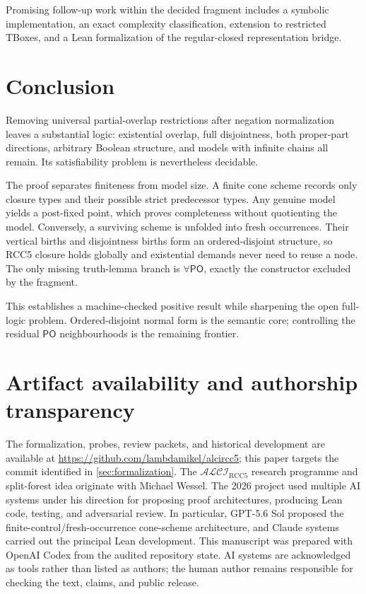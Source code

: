 \documentclass[11pt]{article}
\theoremstyle{plain}
\theoremstyle{definition}
\theoremstyle{remark}
\newcommand{\Logic}{\ensuremath{\mathcal{ALCI}_{\mathrm{RCC5}}}}
\newcommand{\PO}{\ensuremath{\mathsf{PO}}}
\begin{document}
Promising follow-up work within the decided fragment includes a symbolic
implementation, an exact complexity classification, extension to restricted
TBoxes, and a Lean formalization of the regular-closed representation bridge.

\section{Conclusion}

Removing universal partial-overlap restrictions after negation normalization
leaves a substantial logic: existential overlap, full disjointness, both
proper-part directions, arbitrary Boolean structure, and models with infinite
chains all remain.  Its satisfiability problem is nevertheless decidable.

The proof separates finiteness from model size.  A finite cone scheme records
only closure types and their possible strict predecessor types.  Any genuine
model yields a post-fixed point, which proves completeness without quotienting
the model.  Conversely, a surviving scheme is unfolded into fresh
occurrences.  Their vertical births and disjointness births form an
ordered-disjoint structure, so RCC5 closure holds globally and existential
demands never need to reuse a node.  The only missing truth-lemma branch is
$\forall\PO$, exactly the constructor excluded by the fragment.

This establishes a machine-checked positive result while sharpening the open
full-logic problem.  Ordered-disjoint normal form is the semantic core;
controlling the residual $\PO$ neighbourhoods is the remaining frontier.

\section*{Artifact availability and authorship transparency}

The formalization, probes, review packets, and historical development are
available at \url{https://github.com/lambdamikel/alcircc5}; this paper targets
the commit identified in \cref{sec:formalization}.  The $\Logic$ research
programme and split-forest idea originate with Michael Wessel.  The 2026
project used multiple AI systems under his direction for proposing proof
architectures, producing Lean code, testing, and adversarial review.  In
particular, GPT-5.6 Sol proposed the finite-control/fresh-occurrence cone-scheme
architecture, and Claude systems carried out the principal Lean development.
This manuscript was prepared with OpenAI Codex from the audited repository
state.  AI systems are acknowledged as tools rather than listed as authors;
the human author remains responsible for checking the text, claims, and public
release.
\end{document}
